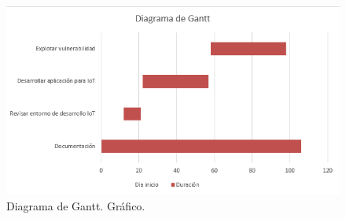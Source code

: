 \begin{figure}[p]
    \centering
    \includegraphics[width=\textwidth]{imagenes/gantt-2.png}
    \caption{Diagrama de Gantt. Gráfico.}
    \label{fig:figure2}
\end{figure}






